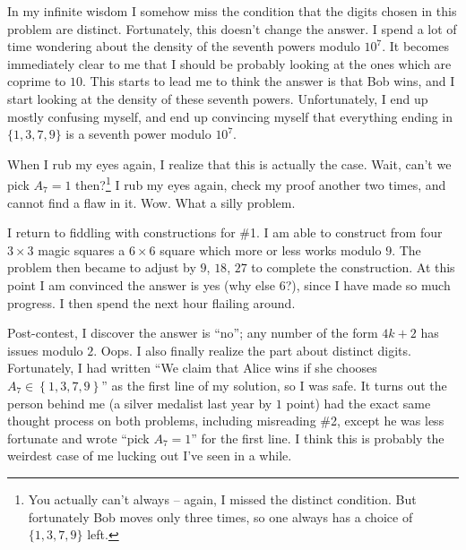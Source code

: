 \documentclass[11pt]{scrreprt}
\begin{document}
In my infinite wisdom I somehow miss the condition that the digits chosen in this problem are distinct. Fortunately, this doesn't change the answer. I spend a lot of time wondering about the density of the seventh powers modulo $10^7$. It becomes immediately clear to me that I should be probably looking at the ones which are coprime to $10$. This starts to lead me to think the answer is that Bob wins, and I start looking at the density of these seventh powers. Unfortunately, I end up mostly confusing myself, and end up convincing myself that everything ending in $\{1,3,7,9\}$ is a seventh power modulo $10^7$.

When I rub my eyes again, I realize that this is actually the case. Wait, can't we pick $A_7=1$ then?\footnote{You actually can't always -- again, I missed the distinct condition. But fortunately Bob moves only three times, so one always has a choice of $\{1,3,7,9\}$ left.} I rub my eyes again, check my proof another two times, and cannot find a flaw in it. Wow. What a silly problem.

I return to fiddling with constructions for \#1.
I am able to construct from four $3 \times 3$ magic squares a $6 \times 6$ square which more or less works modulo $9$. The problem then became to adjust by $9$, $18$, $27$ to complete the construction. At this point I am convinced the answer is yes (why else $6$?), since I have made so much progress. I then spend the next hour flailing around.

Post-contest, I discover the answer is ``no''; any number of the form $4k+2$ has issues modulo $2$.
Oops. I also finally realize the part about distinct digits. Fortunately, I had written ``We claim that Alice wins if she chooses $A_7 \in \left\{ 1,3,7,9 \right\}$'' as the first line of my solution, so I was safe. It turns out the person behind me (a silver medalist last year by $1$ point) had the exact same thought process on both problems, including misreading \#2, except he was less fortunate and wrote ``pick $A_7=1$'' for the first line.
I think this is probably the weirdest case of me lucking out I've seen in a while.
\end{document}
